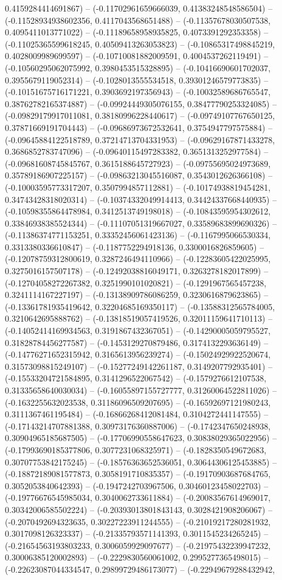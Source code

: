 0.4159284414691867) -- (-0.11702961659666039, 0.41383248548586504) -- (-0.11528934938602356, 0.4117043568651488) -- (-0.11357678030507538, 0.4095411013771022) -- (-0.11189658958935825, 0.4073391292353358) -- (-0.11025365599618245, 0.40509413263053823) -- (-0.10865317498845219, 0.4028009989699597) -- (-0.10710081882009591, 0.4004537262119491) -- (-0.10560295062075992, 0.3980453515328895) -- (-0.10416690601702037, 0.3955679119052314) -- (-0.1028013555534518, 0.39301246579773835) -- (-0.10151675716171221, 0.3903692197356943) -- (-0.10032589686765547, 0.38762782165374887) -- (-0.09924449305076155, 0.38477790253324085) -- (-0.09829179917011081, 0.38180996228440617) -- (-0.09749107767650125, 0.37871669191704443) -- (-0.09686973672532641, 0.3754947797575884) -- (-0.09645884122518789, 0.37214713704331953) -- (-0.09629167871433278, 0.3686852783747096) -- (-0.09640115497283382, 0.3651313252977584) -- (-0.09681608745845767, 0.3615188645727923) -- (-0.09755695024973689, 0.35789186907225157) -- (-0.09863213045516087, 0.3543012626366108) -- (-0.10003595773317207, 0.3507994857112881) -- (-0.10174938819454281, 0.34743428318020314) -- (-0.10374332049914413, 0.34424337668440935) -- (-0.10598355864478984, 0.3412513749198018) -- (-0.10843595954302612, 0.33846938385524344) -- (-0.11107051319667027, 0.33589683899690326) -- (-0.11386374771153251, 0.33352456061423136) -- (-0.1167995066530334, 0.3313380336610847) -- (-0.1187752294918136, 0.3300016826859605) -- (-0.12078759312800619, 0.3287246494110966) -- (-0.12283605422025995, 0.3275016157507178) -- (-0.12492038816049171, 0.3263278182017899) -- (-0.12704058272267382, 0.3251990101020821) -- (-0.1291967565457238, 0.3241114167227197) -- (-0.13138909786086259, 0.3230616879623865) -- (-0.13361781935419642, 0.32204685169350117) -- (-0.13588312565784005, 0.3210642695888762) -- (-0.13818519057419526, 0.32011159641710113) -- (-0.14052414169934563, 0.3191867432367051) -- (-0.14290005059795527, 0.31828784456277587) -- (-0.1453129270879486, 0.3174132293636149) -- (-0.14776271652315942, 0.3165613956239274) -- (-0.15024929922520674, 0.31573098815249107) -- (-0.15277249142261187, 0.3149207792935401) -- (-0.15533204721584895, 0.3141296522067542) -- (-0.1579276612107538, 0.31335658640030034) -- (-0.16055897155727777, 0.31260064522811026) -- (-0.1632255632023538, 0.31186096509207695) -- (-0.16592697121980243, 0.3111367461195484) -- (-0.16866268412081484, 0.3104272441147555) -- (-0.17143214707881388, 0.30973176360887006) -- (-0.1742347650248938, 0.30904965185687505) -- (-0.17706990558647623, 0.30838029365022956) -- (-0.17993690185377806, 0.3077231068325971) -- (-0.1828350549672683, 0.30707753842175245) -- (-0.18576363652536051, 0.30644306125453885) -- (-0.18872189081577873, 0.3058191710835357) -- (-0.19170903687684765, 0.3052053840642393) -- (-0.1947242703967506, 0.30460123458022703) -- (-0.19776676545985034, 0.3040062733611884) -- (-0.20083567614969017, 0.30342006585502224) -- (-0.20393013801843143, 0.3028421908206067) -- (-0.2070492694323635, 0.30227223911244555) -- (-0.21019217280281932, 0.3017098126323337) -- (-0.21335793571141393, 0.3011545234265245) -- (-0.21654563193803233, 0.3006059929097677) -- (-0.21975432239947232, 0.30006385120002893) -- (-0.2229830560061002, 0.2995277365498015) -- (-0.22623087044334547, 0.29899729486173077) -- (-0.22949679288432942, 